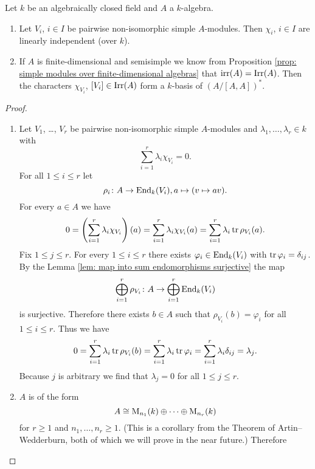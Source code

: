 \begin{thrm} \label{thrm: characters as a basis}
  Let $k$ be an algebraically closed field and $A$ a $k$-algebra.
  \begin{enumerate}[label=\emph{\alph*)},leftmargin=*]
    \item
      Let $V_i$, $i \in I$ be pairwise non-isomorphic simple $A$-modules. Then $\chi_i$, $i \in I$ are linearly independent (over $k$).
    \item
      If $A$ is finite-dimensional and semisimple we know from Proposition \ref{prop: simple modules over finite-dimensional algebras} that $\operatorname{irr}(A) = \operatorname{Irr}(A)$. Then the characters $\chi_{V_i}$, $[V_i] \in \operatorname{Irr}(A)$ form a $k$-basis of $(A/[A,A])^*$.
  \end{enumerate}
\end{thrm}
\begin{proof}
  \begin{enumerate}[label=\emph{\alph*)},leftmargin=*]
    \item
      Let $V_1$, \dots, $V_r$ be pairwise non-isomorphic simple $A$-modules and $\lambda_1, \dotsc, \lambda_r \in k$ with
      \[
        \sum_{i=1}^r \lambda_i \chi_{V_i} = 0.
      \]
      For all $1 \leq i \leq r$ let
      \[
        \rho_i \colon A \to \operatorname{End}_k(V_i), a \mapsto (v \mapsto av).
      \]
      For every $a \in A$ we have
      \[
        0
        = \left( \sum_{i=1}^r \lambda_i \chi_{V_i} \right)(a)
        = \sum_{i=1}^r \lambda_i \chi_{V_i}(a)
        = \sum_{i=1}^r \lambda_i \operatorname{tr} \rho_{V_i}(a).
      \]
      Fix $1 \leq j \leq r$. For every $1 \leq i \leq r$ there exists $\varphi_i \in \operatorname{End}_k(V_i)$ with $\operatorname{tr} \varphi_i = \delta_{ij}$. By the Lemma \ref{lem: map into sum endomorphisms surjective} the map
      \[
        \bigoplus_{i=1}^r \rho_{V_i} \colon A \to \bigoplus_{i=1}^r \operatorname{End}_k(V_i)
      \]
      is surjective. Therefore there exists $b \in A$ such that $\rho_{V_i}(b) = \varphi_i$ for all $1 \leq i \leq r$. Thus we have
      \[
        0
        = \sum_{i=1}^r \lambda_i \operatorname{tr} \rho_{V_i}(b)
        = \sum_{i=1}^r \lambda_i \operatorname{tr} \varphi_i
        = \sum_{i=1}^r \lambda_i \delta_{ij}
        = \lambda_j.
      \]
      Because $j$ is arbitrary we find that $\lambda_j = 0$ for all $1 \leq j \leq r$.
    \item
      $A$ is of the form 
      \[
        A \cong \operatorname{M}_{n_1}(k) \oplus \dotsb \oplus \operatorname{M}_{n_r}(k)
      \]
      for $r \geq 1$ and $n_1, \dotsc, n_r \geq 1$. (This is a corollary from the Theorem of Artin--Wedderburn, both of which we will prove in the near future.) Therefore

\end{enumerate}
\end{proof}

